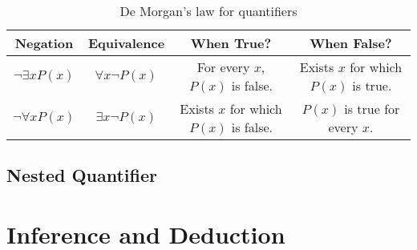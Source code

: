 \begin{table}[H]
\centering
\caption{De Morgan's law for quantifiers}
\begin{tabular}{|c|c|c|c|}
\hline
\textbf{Negation} & \textbf{Equivalence} & \textbf{When True?} & \textbf{When False?} \\
\hline
$\neg \exists x P(x)$ & $\forall x \neg P(x)$ & For every $x$, $P(x)$ is false. & Exists $x$ for which $P(x)$ is true. \\
\hline
$\neg \forall x P(x)$ & $\exists x \neg P(x)$ & Exists $x$ for which $P(x)$ is false. & $P(x)$ is true for every $x$. \\
\hline
\end{tabular}
\end{table}

\subsection{Nested Quantifier}



    \section{Inference and Deduction}
